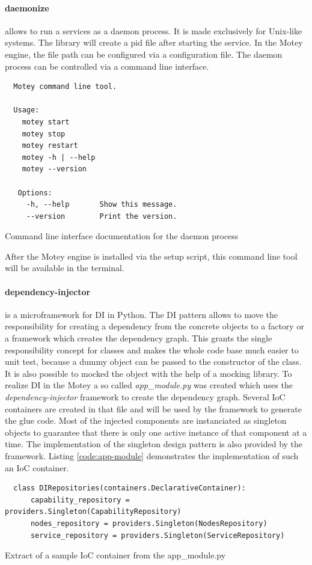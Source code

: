 \paragraph{daemonize} allows to run a services as a daemon process.
It is made exclusively for Unix-like systems.
The library will create a pid file after starting the service.
In the Motey engine, the file path can be configured via a configuration file.
The daemon process can be controlled via a command line interface.
\begin{listing}[H]
  \begin{verbatim}
  Motey command line tool.

  Usage:
    motey start
    motey stop
    motey restart
    motey -h | --help
    motey --version

   Options:
     -h, --help       Show this message.
     --version        Print the version.
  \end{verbatim}
  \caption{Command line interface documentation for the daemon process}
  \label{code:cli-tool}
\end{listing}
After the Motey engine is installed via the setup script, this command line tool will be available in the terminal.

\paragraph{dependency-injector} is a microframework for \acf{DI} in Python.
The \ac{DI} pattern allows to move the responsibility for creating a dependency from the concrete objects to a factory or a framework which creates the dependency graph.
This grants the single responsibility concept for classes and makes the whole code base much easier to unit test, because a dummy object can be passed to the constructor of the class.
It is also possible to mocked the object with the help of a mocking library.
To realize \ac{DI} in the Motey a so called \textit{app\_module.py} was created which uses the \textit{dependency-injector} framework to create the dependency graph.
Several \ac{IoC} containers are created in that file and will be used by the framework to generate the glue code.
Most of the injected components are instanciated as singleton objects to guarantee that there is only one active instance of that component at a time.
The implementation of the singleton design pattern is also provided by the framework.
Listing \ref{code:app-module} demonstrates the implementation of such an \ac{IoC} container.
\begin{listing}[H]
  \begin{verbatim}
  class DIRepositories(containers.DeclarativeContainer):
      capability_repository = providers.Singleton(CapabilityRepository)
      nodes_repository = providers.Singleton(NodesRepository)
      service_repository = providers.Singleton(ServiceRepository)
  \end{verbatim}
  \caption{Extract of a sample \ac{IoC} container from the app\_module.py}
  \label{code:app-module}
\end{listing}

